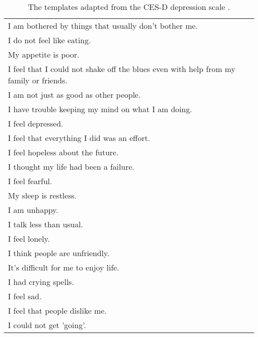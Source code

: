 \documentclass[letterpaper]{article} %
\begin{document}
\begin{table*}[htbp]
  \centering
  \begin{tabular}{|l|}
    \hline
    I am bothered by things that usually don't bother me. \\
    I do not feel like eating. \\
    My appetite is poor. \\
    I feel that I could not shake off the blues even with help from my family or friends. \\
    I am not just as good as other people. \\
    I have trouble keeping my mind on what I am doing. \\
    I feel depressed. \\
    I feel that everything I did was an effort. \\
    I feel hopeless about the future. \\
    I thought my life had been a failure. \\
    I feel fearful. \\
    My sleep is restless. \\
    I am unhappy. \\
    I talk less than usual. \\
    I feel lonely. \\
    I think people are unfriendly. \\
    It's difficult for me to enjoy life. \\
    I had crying spells. \\
    I feel sad. \\
    I feel that people dislike me. \\
    I could not get 'going'. \\
    \hline
  \end{tabular}
  \caption{\label{tab:CES-D} The templates adapted from the CES-D depression scale \citep{lewinsohn1997center}. }
\end{table*}
\end{document}
